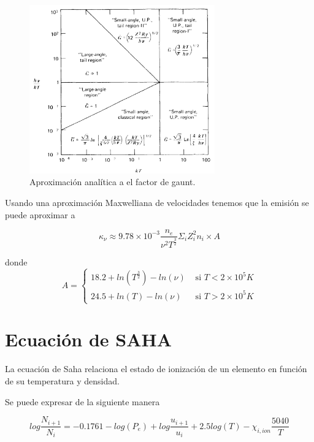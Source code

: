 \documentclass[a4paper]{article}
\begin{document}
\begin{figure}[!htbp]
\begin{center}
\includegraphics[width=8cm]{gaunt.png}
\end{center}
\caption{Aproximación analítica a el factor de gaunt.}\label{gaunt}
\end{figure}

Usando una aproximación Maxwelliana de velocidades tenemos que la emisión se puede aproximar a

\begin{equation}\label{eq14}
    \kappa_\nu \approx 9.78 \times 10^{-3} \frac{n_e}{\nu^2 T^{\frac{3}{2}}} \Sigma_i Z_i^2 n_i \times A
\end{equation}

donde 
\begin{equation*}
A = \left\{
\begin{array}{ll}
18.2 + ln(T^{\frac{3}{2}}) - ln(\nu) & \mbox{ si } T < 2\times 10^5 K\\
24.5 + ln(T) - ln(\nu) & \mbox{ si } T > 2\times 10^5 K
\end{array}
\right.
\end{equation*}

\newpage
\section{Ecuación de SAHA}
La ecuación de Saha relaciona el estado de ionización de un elemento en función de su temperatura y densidad.

Se puede expresar de la siguiente manera

\begin{equation}
    log\frac{N_{i+1}}{N_i} = -0.1761 - log(P_e) + log\frac{u_{i+1}}{u_i} + 2.5 log(T) - \chi_{i, ion} \frac{5040}{T}
\end{equation}
\end{document}
